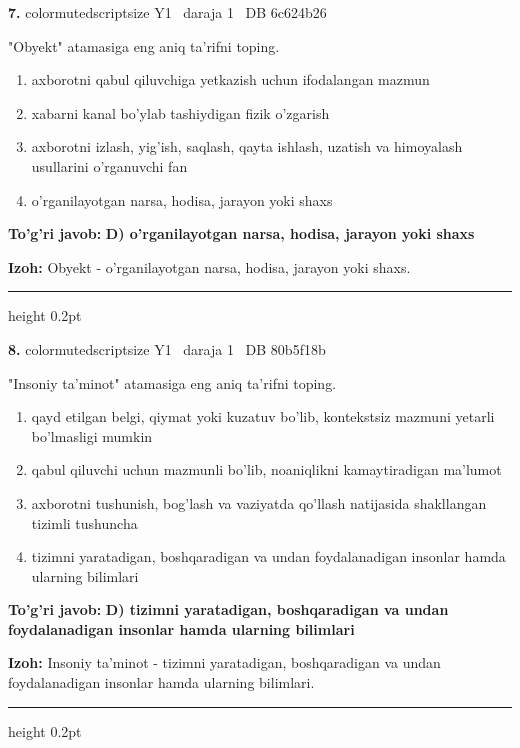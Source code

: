 \documentclass[10pt,a4paper,oneside]{article}
\begin{document}
\noindent\textbf{\color{ink}7.}  {color{muted}scriptsize Y1 \textbullet\ daraja 1 \textbullet\ DB 6c624b26}
\par
"Obyekt" atamasiga eng aniq ta'rifni toping.
\begin{enumerate}[label=\Alph*),leftmargin=9mm]
\item axborotni qabul qiluvchiga yetkazish uchun ifodalangan mazmun
\item xabarni kanal bo'ylab tashiydigan fizik o'zgarish
\item axborotni izlash, yig'ish, saqlash, qayta ishlash, uzatish va himoyalash usullarini o'rganuvchi fan
\item o'rganilayotgan narsa, hodisa, jarayon yoki shaxs
\end{enumerate}
\begin{tcolorbox}[enhanced,breakable,colback=teal!4,colframe=teal!50!black,boxrule=0.5pt,arc=1.1mm,left=3mm,right=3mm,top=1.7mm,bottom=1.7mm,before skip=2mm,after skip=2mm]
\textbf{\color{teal}To'g'ri javob:} \textbf{D) o'rganilayotgan narsa, hodisa, jarayon yoki shaxs}
\par\smallskip
\textbf{Izoh:} Obyekt - o'rganilayotgan narsa, hodisa, jarayon yoki shaxs.
\end{tcolorbox}
\vspace{2mm}\hrule height 0.2pt \vspace{3mm}

\noindent\textbf{\color{ink}8.}  {color{muted}scriptsize Y1 \textbullet\ daraja 1 \textbullet\ DB 80b5f18b}
\par
"Insoniy ta'minot" atamasiga eng aniq ta'rifni toping.
\begin{enumerate}[label=\Alph*),leftmargin=9mm]
\item qayd etilgan belgi, qiymat yoki kuzatuv bo'lib, kontekstsiz mazmuni yetarli bo'lmasligi mumkin
\item qabul qiluvchi uchun mazmunli bo'lib, noaniqlikni kamaytiradigan ma'lumot
\item axborotni tushunish, bog'lash va vaziyatda qo'llash natijasida shakllangan tizimli tushuncha
\item tizimni yaratadigan, boshqaradigan va undan foydalanadigan insonlar hamda ularning bilimlari
\end{enumerate}
\begin{tcolorbox}[enhanced,breakable,colback=teal!4,colframe=teal!50!black,boxrule=0.5pt,arc=1.1mm,left=3mm,right=3mm,top=1.7mm,bottom=1.7mm,before skip=2mm,after skip=2mm]
\textbf{\color{teal}To'g'ri javob:} \textbf{D) tizimni yaratadigan, boshqaradigan va undan foydalanadigan insonlar hamda ularning bilimlari}
\par\smallskip
\textbf{Izoh:} Insoniy ta'minot - tizimni yaratadigan, boshqaradigan va undan foydalanadigan insonlar hamda ularning bilimlari.
\end{tcolorbox}
\vspace{2mm}\hrule height 0.2pt \vspace{3mm}
\end{document}
